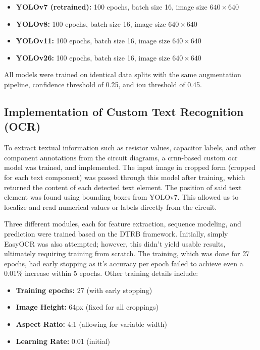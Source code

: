 \begin{itemize}
    \item \textbf{YOLOv7 (retrained):} 100 epochs, batch size 16, image size $640 \times 640$
    \item \textbf{YOLOv8:} 100 epochs, batch size 16, image size $640 \times 640$
    \item \textbf{YOLOv11:} 100 epochs, batch size 16, image size $640 \times 640$
    \item \textbf{YOLOv26:} 100 epochs, batch size 16, image size $640 \times 640$
\end{itemize}

All models were trained on identical data splits with the same augmentation pipeline, confidence threshold of 0.25, and \gls{iou} threshold of 0.45. 

\subsection{Implementation of Custom Text Recognition (OCR)}

To extract textual information such as resistor values, capacitor labels, and other component annotations from the circuit diagrams, a \gls{crnn}-based custom \gls{ocr} model was trained, and implemented. The input image in cropped form (cropped for each text component) was passed through this model after training, which returned the content of each detected text element. The position of said text element was found using bounding boxes from YOLOv7. This allowed us to localize and read numerical values or labels directly from the circuit.

Three different modules, each for feature extraction, sequence modeling, and prediction were trained based on the DTRB framework. Initially, simply EasyOCR was also attempted; however, this didn't yield usable results, ultimately requiring training from scratch. The training, which was done for 27 epochs, had early stopping as it's accuracy per epoch failed to achieve even a 0.01\% increase within 5 epochs. Other training details include:

\begin{itemize}
    \item \textbf{Training epochs:} 27 (with early stopping)
    \item \textbf{Image Height:} 64px (fixed for all croppings)
    \item \textbf{Aspect Ratio:} 4:1 (allowing for variable width)
    \item \textbf{Learning Rate:} 0.01 (initial)
\end{itemize}

